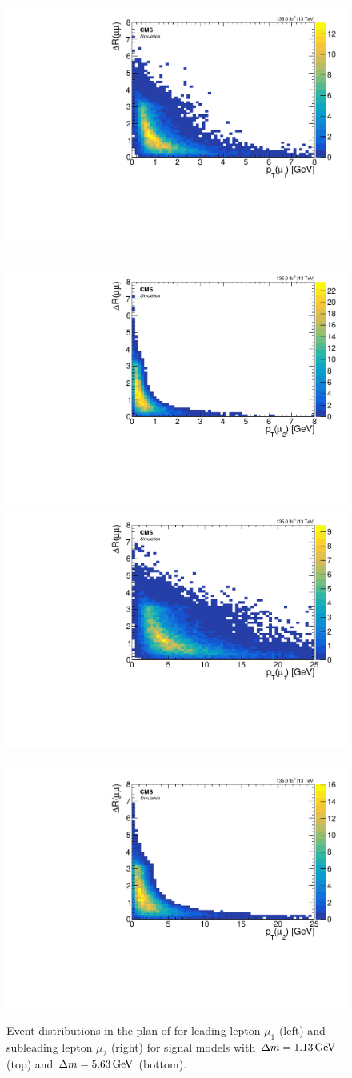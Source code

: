 \begin{figure}[!htb]
\centering
\includegraphics[width=0.48\linewidth]{plots/signal_muons_gen_delta_r_vs_pt/none_gen_delta_r_vs_pt_1.pdf} \,
\includegraphics[width=0.48\linewidth]{plots/signal_muons_gen_delta_r_vs_pt/none_gen_delta_r_vs_pt_2.pdf}  \\
\includegraphics[width=0.48\linewidth]{plots/signal_muons_gen_delta_r_vs_pt_dm5/none_gen_delta_r_vs_pt_1.pdf} \,
\includegraphics[width=0.48\linewidth]{plots/signal_muons_gen_delta_r_vs_pt_dm5/none_gen_delta_r_vs_pt_2.pdf}  \\
\caption[Event distributions in the plan of \drmm \vs \pt for signal models]{ Event distributions in the plan of \drmm \vs \pt for leading lepton $\mu_1$ (left) and subleading lepton $\mu_2$ (right) for signal models with $\Delta m=1.13\,\text{Ge\hspace{-.08em}V}$ (top) and $\Delta m=5.63\,\text{Ge\hspace{-.08em}V}$ (bottom).}
\label{fig:signal-gen-dr-pt}
\end{figure}

